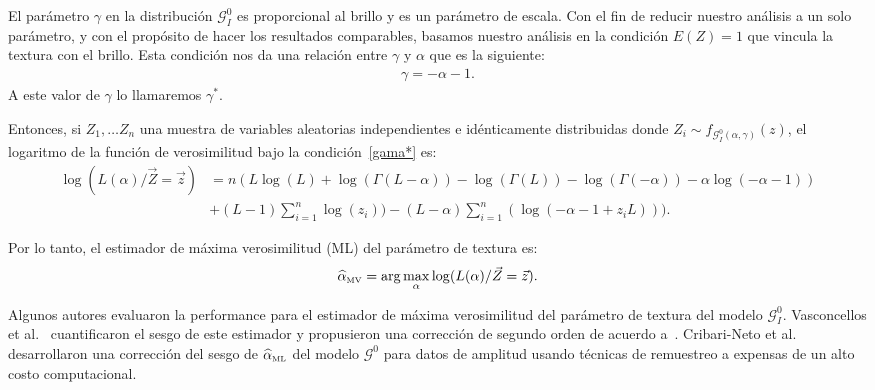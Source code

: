 El parámetro $\gamma$ en la distribución $\mathcal{G}_I^0$  es proporcional al brillo y es un parámetro de escala. Con el fin de reducir nuestro análisis a un solo parámetro, y con el propósito de hacer los resultados comparables, basamos nuestro análisis en la condición $E(Z)=1$ que vincula la textura con el brillo. Esta condición nos da una relación entre $\gamma$ y $\alpha$ que es la siguiente:
\begin{align}
\label{gama*}
\gamma=-\alpha-1. 
\end{align}
A este valor de $\gamma$ lo llamaremos $\gamma^*$.

Entonces, si $Z_1,\ldots Z_n$ una muestra de variables aleatorias independientes e idénticamente distribuidas donde $Z_i \sim f_{\mathcal G_I^0(\alpha,\gamma)}(z)$,  el logaritmo de la función de verosimilitud bajo la condición~\eqref{gama*} es:
\begin{align}
\nonumber \log(L(\alpha)/\vec{Z}=\vec{z})&=n(L \log(L)+\log(\Gamma(L-\alpha))-\log(\Gamma(L))-\log(\Gamma(-\alpha))-\alpha \log(-\alpha-1))\\
& + (L-1) \sum_{i=1}^n \log(z_i))-(L-\alpha) \sum_{i=1}^n(\log(-\alpha-1+z_i L))).
\end{align}


Por lo tanto, el estimador de máxima verosimilitud (ML) del parámetro de textura es:
\begin{align}
\widehat{\alpha}_{{\text{\tiny{MV}}}}=\arg\max_{\alpha} \log(L(\alpha)/\vec{Z}=\vec{z}).
\end{align}

Algunos autores evaluaron la performance para el estimador de máxima verosimilitud del parámetro de textura del modelo  $\mathcal G_I^0$. Vasconcellos et al.~\cite{VasconcellosFrerySilva:CompStat} cuantificaron el sesgo de este estimador y propusieron una corrección de segundo orden de acuerdo a~\cite{cox1968}. Cribari-Neto et al.~\cite{CribariFrerySilva:CSDA} desarrollaron una corrección del sesgo de $\widehat{\alpha}_{\text{{\text{\tiny{ML}}}}}$ del modelo $\mathcal G^0$ para datos de amplitud usando técnicas de remuestreo a expensas de un alto costo computacional.

